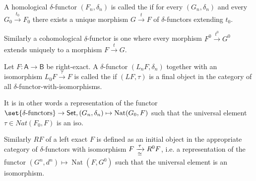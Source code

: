 \documentclass[fontsize=11pt,fleqn,a4paper]{scrartcl}
\begin{document}
\begin{definition}
A homological $\delta$-functor $(F_n,\delta_n)$ is called the  if for every $(G_n,\delta_n)$ and every $G_0 \xrightarrow{t_0} F_0$ there exists a unique morphism $G \xrightarrow{t} F$ of $\delta$-functors extending $t_0$.

Similarly a cohomological $\delta$-functor is one where every morphism $F^0 \xrightarrow{t^0} G^0$ extends uniquely to a morphism $F \xrightarrow{t} G$.
\end{definition}

\begin{definition}
Let $F: \mathsf{A} \to \mathsf{B}$ be right-exact. A $\delta$-functor $(L_nF,\delta_n)$ together with an isomorphism $L_0 F \xrightarrow{\tau} F$ is called the  if $(LF,\tau)$ is a final object in the category of all $\delta$-functor-with-isomorphisms.

It is in other words a representation of the functor $\set{\delta\text{-functors}} \to \mathsf{Set}, (G_n,\delta_n)\mapsto \operatorname{Nat}(G_0,F)$ such that the universal element $\tau\in Nat(F_0,F)$ is an iso.

\medbreak
Similarly  $RF$ of a left exact $F$ is defined as an initial object in the appropriate category of $\delta$-functors with isomorphism $F\xrightarrow[\cong]{\tau} R^0 F$, i.e. a representation of the functor $(G^n,d^n) \mapsto \operatorname{Nat}(F,G^0)$ such that the universal element is an isomorphism.
\end{definition}
\end{document}
